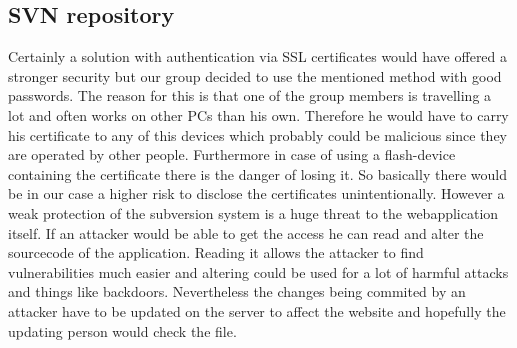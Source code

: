 \subsection {SVN repository}


\noindent
Certainly a solution with authentication via SSL certificates would have offered a stronger security but our group decided to use the mentioned method with good passwords. The reason for this is that one of the group members is travelling a lot and often works on other PCs than his own. Therefore he would have to carry his certificate to any of this devices which probably could be malicious since they are operated by other people. Furthermore in case of using a flash-device containing the certificate there is the danger of losing it.
So basically there would be in our case a higher risk to disclose the certificates unintentionally.
However a weak protection of the subversion system is a huge threat to the webapplication itself. If an attacker would be able to get the access he can read and alter the sourcecode of the application. Reading it allows the attacker to find vulnerabilities much easier and altering could be used for a lot of harmful attacks and things like backdoors. Nevertheless the changes being commited by an attacker have to be updated on the server to affect the website and hopefully the updating person would check the file.



